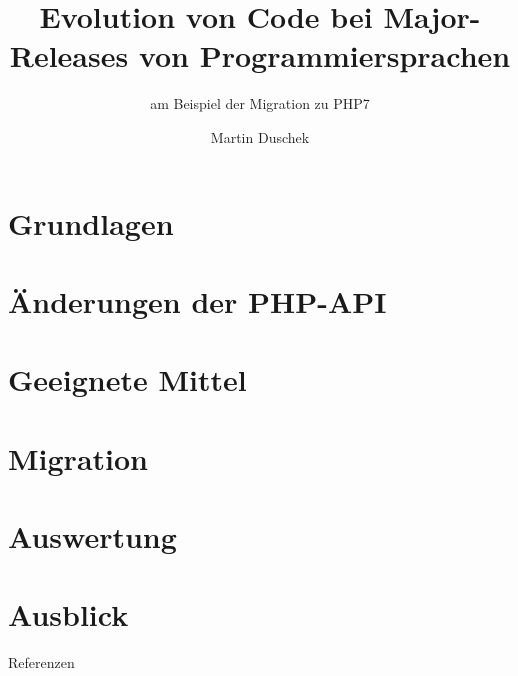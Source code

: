 \documentclass[11pt, xcolor=dvipsnames]{beamer}
\author{Martin Duschek}
\title{Evolution von Code bei Major-Releases von Programmiersprachen}
\subtitle{am Beispiel der Migration zu PHP7}
\institute{HTWK Leipzig}
\begin{document}
	

	\section{Grundlagen}
	
	
	\section{Änderungen der PHP-API}
	
	
	\section{Geeignete Mittel}
	

	\section{Migration}
		

	\section{Auswertung}
	

	\section{Ausblick}
	

	\begin{frame}[allowframebreaks]{Referenzen}
		
			  
	  \end{frame}
\end{document}

